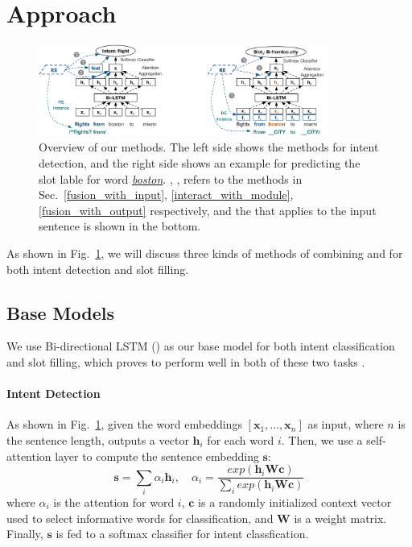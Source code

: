 \section{Approach}

\begin{figure}[t!]
\begin{center}
\includegraphics[width=0.85\textwidth]{figure/re_nn_overview.png}    
\caption{Overview of our methods. The left side shows the methods for intent detection, and the right side shows an example for predicting the slot lable for word \textsl{\underline{boston}}. , ,  refers to the methods in Sec.~\ref{fusion_with_input}, \ref{interact_with_module}, \ref{fusion_with_output} respectively, and the \RE that applies to the input sentence is shown in the bottom.}
\label{fig_overview}
\end{center}
\vspace{-1em}
\end{figure}

As shown in Fig.~\ref{fig_overview}, we will discuss three kinds of methods of combining \NN and \RE for both intent detection and slot filling.

\subsection{Base Models}
We use Bi-directional LSTM (\BLSTM) as our base \NN model for both intent classification and slot filling, which proves to perform well in both of these two tasks \cite{liu2016attention}. 
\paragraph{Intent Detection}
As shown in Fig.~\ref{fig_overview}, given the word embeddings $[\textbf{x}_1, ..., \textbf{x}_n]$ as input, where $n$ is the sentence length, \BLSTM outputs a vector $\textbf{h}_i$ for each word $i$. 
Then, we use a self-attention layer to compute the sentence embedding $\textbf{s}$:
\begin{equation}
\textbf{s} = \sum_{i}{\alpha_i\textbf{h}_i}, \quad \alpha_i=\frac{exp(\textbf{h}_i\textbf{Wc})}{\sum_{i}{exp(\textbf{h}_i\textbf{Wc})}}
\label{eq:simple_att}
\end{equation}
where  $\alpha_i$ is the attention for word $i$, $\textbf{c}$ is a randomly initialized context vector used to select informative words for classification, and $\textbf{W}$ is a weight matrix. 
Finally, $\textbf{s}$ is fed to a softmax classifier for intent classfication.

